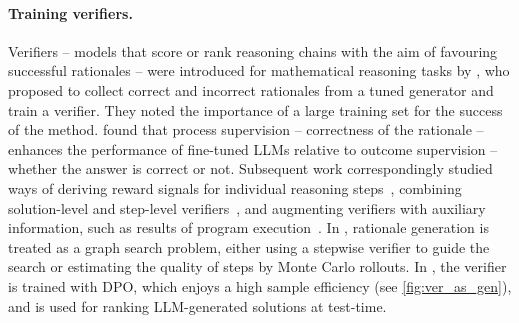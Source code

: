 




\paragraph{Training verifiers.} Verifiers -- models that score or rank reasoning chains with the aim of favouring successful rationales -- were introduced for mathematical reasoning tasks by \citet{DBLP:journals/corr/abs-2110-14168}, who proposed to collect correct and incorrect rationales from a tuned generator and train a verifier. They noted the importance of a large training set for the success of the method. \citet{DBLP:journals/corr/abs-2211-14275} found that process supervision -- correctness of the rationale -- enhances the performance of fine-tuned LLMs relative to outcome supervision -- whether the answer is correct or not. Subsequent work correspondingly studied ways of deriving reward signals for individual reasoning steps~\citep{li-etal-2023-making,DBLP:journals/corr/abs-2305-20050,yu2023outcome}, combining solution-level and step-level verifiers~\citep{zhu-etal-2023-solving}, and augmenting verifiers with auxiliary information, such as results of program execution~\citep{ni2023lever}. In \citet{ma2023lets,DBLP:journals/corr/abs-2312-08935}, rationale generation is treated as a graph search problem, either using a stepwise verifier to guide the search or estimating the quality of steps by Monte Carlo rollouts. In \vstar{}, the verifier is trained with DPO, which enjoys a high sample efficiency (see \autoref{fig:ver_as_gen}), and is used for ranking LLM-generated solutions at test-time. 

